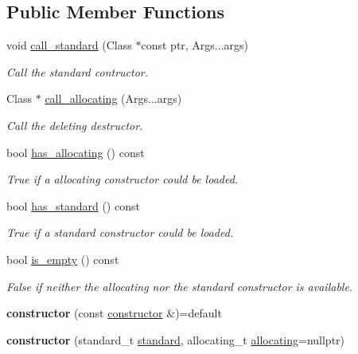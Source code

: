 \subsection*{Public Member Functions}
\begin{DoxyCompactItemize}
\item 
\mbox{\label{a01356_a2b0dbd4b6c5fb1c8fa284b64f85e3caa}} 
void \hyperlink{a01356_a2b0dbd4b6c5fb1c8fa284b64f85e3caa}{call\+\_\+standard} (Class $\ast$const ptr, Args...\+args)
\begin{DoxyCompactList}\small\item\em Call the standard contructor. \end{DoxyCompactList}\item 
\mbox{\label{a01356_a9674344355e9759b8f60a4eb92e718af}} 
Class $\ast$ \hyperlink{a01356_a9674344355e9759b8f60a4eb92e718af}{call\+\_\+allocating} (Args...\+args)
\begin{DoxyCompactList}\small\item\em Call the deleting destructor. \end{DoxyCompactList}\item 
\mbox{\label{a01356_a8f7a1ee62ed8cd923a05f12544d10787}} 
bool \hyperlink{a01356_a8f7a1ee62ed8cd923a05f12544d10787}{has\+\_\+allocating} () const
\begin{DoxyCompactList}\small\item\em True if a allocating constructor could be loaded. \end{DoxyCompactList}\item 
\mbox{\label{a01356_a30a1be17551af78128f3f0d10fd0b5e9}} 
bool \hyperlink{a01356_a30a1be17551af78128f3f0d10fd0b5e9}{has\+\_\+standard} () const
\begin{DoxyCompactList}\small\item\em True if a standard constructor could be loaded. \end{DoxyCompactList}\item 
\mbox{\label{a01356_a4fd80b98d5c5ea2d9482c8f30657ec40}} 
bool \hyperlink{a01356_a4fd80b98d5c5ea2d9482c8f30657ec40}{is\+\_\+empty} () const
\begin{DoxyCompactList}\small\item\em False if neither the allocating nor the standard constructor is available. \end{DoxyCompactList}\item 
\mbox{\label{a01356_a6ae77617757558a1b0177d6a2cae9827}} 
{\bfseries constructor} (const \hyperlink{a01352}{constructor} \&)=default
\item 
\mbox{\label{a01356_a403d27f9f509c0ce4e66d4713ca2affc}} 
{\bfseries constructor} (standard\+\_\+t \hyperlink{a01356_a6cbccda8c81959e8e3bba7da28cada5d}{standard}, allocating\+\_\+t \hyperlink{a01356_a13c90a276dc453ca83da117ffc552362}{allocating}=nullptr)
\end{DoxyCompactItemize}

